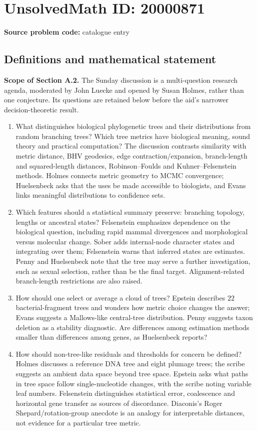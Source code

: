 \documentclass[11pt]{article}
\begin{document}
\section*{UnsolvedMath ID: 20000871}
\textbf{Source problem code:} catalogue entry
\subsection{Definitions and mathematical statement}
\textbf{Scope of Section A.2.} The Sunday discussion is a multi-question research agenda, moderated by John Luecke and opened by Susan Holmes, rather than one conjecture. Its questions are retained below before the aid's narrower decision-theoretic result.
\begin{enumerate}
\item What distinguishes biological phylogenetic trees and their distributions from random branching trees? Which tree metrics have biological meaning, sound theory and practical computation? The discussion contrasts similarity with metric distance, BHV geodesics, edge contraction/expansion, branch-length and squared-length distances, Robinson--Foulds and Kuhner--Felsenstein methods. Holmes connects metric geometry to MCMC convergence; Huelsenbeck asks that the uses be made accessible to biologists, and Evans links meaningful distributions to confidence sets.
\item Which features should a statistical summary preserve: branching topology, lengths or ancestral states? Felsenstein emphasizes dependence on the biological question, including rapid mammal divergences and morphological versus molecular change. Sober adds internal-node character states and integrating over them; Felsenstein warns that inferred states are estimates. Penny and Huelsenbeck note that the tree may serve a further investigation, such as sexual selection, rather than be the final target. Alignment-related branch-length restrictions are also raised.
\item How should one select or average a cloud of trees? Epstein describes $22$ bacterial-fragment trees and wonders how metric choice changes the answer; Evans suggests a Mallows-like central-tree distribution. Penny suggests taxon deletion as a stability diagnostic. Are differences among estimation methods smaller than differences among genes, as Huelsenbeck reports?
\item How should non-tree-like residuals and thresholds for concern be defined? Holmes discusses a reference DNA tree and eight plumage trees; the scribe suggests an ambient data space beyond tree space. Epstein asks what paths in tree space follow single-nucleotide changes, with the scribe noting variable leaf numbers. Felsenstein distinguishes statistical error, coalescence and horizontal gene transfer as sources of discordance. Diaconis's Roger Shepard/rotation-group anecdote is an analogy for interpretable distances, not evidence for a particular tree metric.

\end{enumerate}
\end{document}
